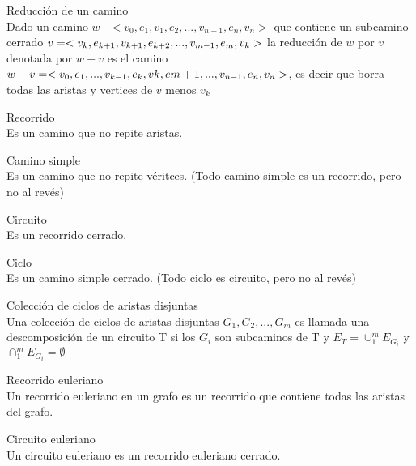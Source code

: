 \documentclass{article}
\begin{document}
\begin{defn}
Reducción de un camino \\ Dado un camino $w-< v_{0}, e_{1}, v_{1}, e_{2},..., v_{n-1}, e_{n}, v_{n} >$ que contiene un subcamino cerrado $v = < v_{k}, e_{k+1}, v_{k+1}, e_{k+2},...,\\ v_{m-1}, e_{m}, v_{k} >$ la reducción de $w$ por $v$ denotada por $w-v$ es el camino $w-v=< v_{0}, e_{1},...,v_{k-1},e_{k}, v{k},e{m+1},...,\\ v_{n-1}, e_{n}, v_{n} >$, es decir que borra todas las aristas y vertices de $v$ menos $v_{k}$
\end{defn}

\begin{defn}
Recorrido \\ Es un camino que no repite aristas.
\end{defn}

\begin{defn}
Camino simple \\ Es un camino que no repite véritces. (Todo camino simple es un recorrido, pero no al revés)
\end{defn}

\begin{defn}
Circuito \\ Es un recorrido cerrado.
\end{defn}

\begin{defn}
Ciclo \\ Es un camino simple cerrado. (Todo ciclo es circuito, pero no al revés)
\end{defn}

\begin{defn}
Colección de ciclos de aristas disjuntas \\ Una colección de ciclos de aristas disjuntas $G_{1}, G_{2},..., G_{m}$ es llamada una descomposición de un circuito T si los $G_{i}$ son subcaminos de T y $E_{T} = \cup_{1}^{m}E_{G_{i}}$ y $\cap_{1}^{m}E_{G_{i}} = \emptyset$
\end{defn}

\begin{defn}
Recorrido euleriano \\ Un recorrido euleriano en un grafo es un recorrido que contiene todas las aristas del grafo.
\end{defn}

\begin{defn}
Circuito euleriano \\ Un circuito euleriano es un recorrido euleriano cerrado.
\end{defn}
\end{document}
